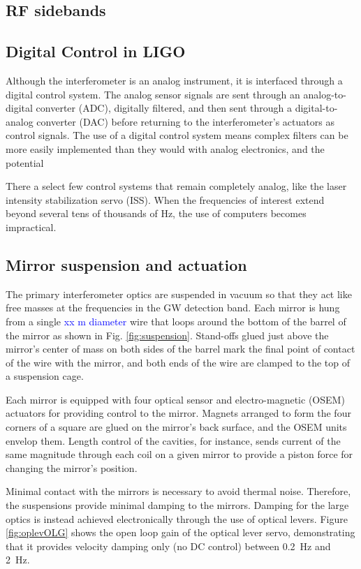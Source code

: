 \subsection{RF sidebands}



\subsection{Digital Control in LIGO}
Although the interferometer is an analog instrument, it is interfaced
through a digital control system. The analog sensor signals are sent
through an analog-to-digital converter (ADC), digitally filtered, and
then sent through a digital-to-analog converter (DAC) before returning
to the interferometer's actuators as control signals. The use of a digital
control system means complex filters can be more easily implemented
than they would with analog electronics, and the potential 

There a select few control systems that remain completely analog, like
the laser intensity stabilization servo (ISS). When the frequencies of
interest extend beyond several tens of thousands of Hz, the use of
computers becomes impractical.




\subsection{Mirror suspension and actuation}
\label{sec:suspension}
The primary interferometer optics are suspended in vacuum so that they
act like free masses at the frequencies in the GW detection band. Each
mirror is hung from a single \textcolor{blue}{xx m diameter} wire that
loops around the bottom of the barrel of the mirror as shown in
Fig. \ref{fig:suspension}. Stand-offs glued just above the mirror's
center of mass on both sides of the barrel mark the final point of
contact of the wire with the mirror, and both ends of the wire are
clamped to the top of a suspension cage.

Each mirror is equipped with four optical sensor and electro-magnetic
(OSEM) actuators for providing control to the mirror. Magnets arranged
to form the four corners of a square are glued on the mirror's back
surface, and the OSEM units envelop them. Length control of the
cavities, for instance, sends current of the same magnitude through
each coil on a given mirror to provide a piston force for changing the
mirror's position.

Minimal contact with the mirrors is necessary to avoid thermal
noise. Therefore, the suspensions provide minimal damping to the
mirrors. Damping for the large optics is instead achieved
electronically through the use of optical levers. Figure
\ref{fig:oplevOLG} shows the open loop gain of the optical lever
servo, demonstrating that it provides velocity damping only (no DC
control) between 0.2~Hz and 2~Hz.

